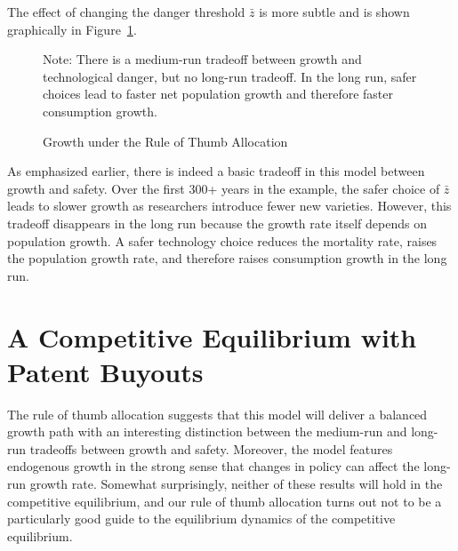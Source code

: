 \documentclass[12pt,twoside]{article}
\newcommand{\cn}[1]{\citet*{#1}}
\newcommand{\fignote}[2]{\begin{center}\parbox[c]{#1}{\footnotesize #2} \end{center}}
\begin{document}
The effect of changing the danger threshold $\bar{z}$ is more subtle
and is shown graphically in Figure~\ref{fig:rule}.
\begin{figure}[tp]
\caption{Growth under the Rule of Thumb Allocation}
\label{fig:rule}
\fignote{4.5in}{Note: There is a medium-run tradeoff between growth and
  technological danger, but no long-run tradeoff.  In the long run,
  safer choices lead to faster net population growth and therefore
  faster consumption growth.}
\end{figure} 
As emphasized earlier, there is indeed a basic tradeoff in this model
between growth and safety.  Over the first 300+ years in the example,
the safer choice of $\bar{z}$ leads to slower growth as researchers
introduce fewer new varieties.  However, this tradeoff disappears in the
long run because the growth rate itself depends on population growth.  A
safer technology choice reduces the mortality rate, raises the
population growth rate, and therefore raises consumption growth in the
long run.



\section{A Competitive Equilibrium with Patent Buyouts}

The rule of thumb allocation suggests that this model will deliver a
balanced growth path with an interesting distinction between the
medium-run and long-run tradeoffs between growth and safety.  Moreover,
the model features endogenous growth in the strong sense that changes in
policy can affect the long-run growth rate.  Somewhat surprisingly,
neither of these results will hold in the competitive equilibrium, and
our rule of thumb allocation turns out not to be a particularly good
guide to the equilibrium dynamics of the competitive equilibrium.
\end{document}
